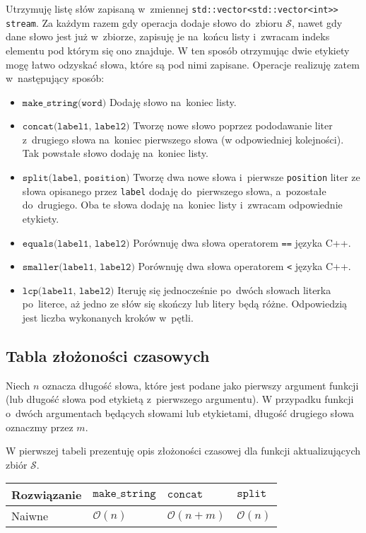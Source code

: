 \documentclass[declaration,shortabstract]{iithesis}
\theoremstyle{definition} \newtheorem{definition}{Definicja}[chapter]
\theoremstyle{plain} \newtheorem{remark}[definition]{Obserwacja}
\theoremstyle{plain} \newtheorem{theorem}[definition]{Twierdzenie}
\theoremstyle{plain} \newtheorem{example}{Przykład}[definition]
\theoremstyle{plain} \newtheorem{lemma}[definition]{Lemat}
\begin{document}
Utrzymuję listę słów zapisaną w~zmiennej \texttt{std::vector<std::vector<int>> stream}. Za każdym razem gdy operacja dodaje słowo do~zbioru $\mathcal{S}$, nawet gdy dane słowo jest już w~zbiorze, zapisuję je na~końcu listy i~zwracam indeks elementu pod którym się ono znajduje. W ten sposób otrzymując dwie etykiety mogę łatwo odzyskać słowa, które są pod nimi zapisane. Operacje realizuję zatem w~następujący sposób:
\begin{itemize}
    \item $\texttt{make\_string(word)}$ Dodaję słowo na~koniec listy.
    \item $\texttt{concat(label1, label2)}$ Tworzę nowe słowo poprzez pododawanie liter z~drugiego słowa na~koniec pierwszego słowa (w odpowiedniej kolejności). Tak powstałe słowo dodaję na~koniec listy. 
    \item $\texttt{split(label, position)}$ Tworzę dwa nowe słowa i~pierwsze \texttt{position} liter ze słowa opisanego przez \texttt{label} dodaję do~pierwszego słowa, a~pozostałe do~drugiego. Oba te słowa dodaję na~koniec listy i~zwracam odpowiednie etykiety.
    \item $\texttt{equals(label1, label2)}$ Porównuję dwa słowa operatorem \texttt{==} języka C++.
    \item $\texttt{smaller(label1, label2)}$ Porównuję dwa słowa operatorem \texttt{<} języka C++.
    \item $\texttt{lcp(label1, label2)}$ Iteruję się jednocześnie po~dwóch słowach literka po~literce, aż jedno ze słów się skończy lub litery będą różne. Odpowiedzią jest liczba wykonanych kroków w~pętli.
\end{itemize}

\subsection{Tabla złożoności czasowych}

Niech $n$ oznacza długość słowa, które jest podane jako pierwszy argument funkcji (lub długość słowa pod etykietą z~pierwszego argumentu). W przypadku funkcji o~dwóch argumentach będących słowami lub etykietami, długość drugiego słowa oznaczmy przez $m$.

W pierwszej tabeli prezentuję opis złożoności czasowej dla funkcji aktualizujących zbiór $\mathcal{S}$.

\begin{center}
    \begin{tabular}{ | m{3cm} | >{\centering\arraybackslash}m{3cm} | >{\centering\arraybackslash}m{3cm} | >{\centering\arraybackslash}m{3cm} | }
        \hline 
        Rozwiązanie & $\texttt{make\_string}$ & $\texttt{concat}$ & $\texttt{split}$ \\
        \hline
        Naiwne & $\mathcal{O}(n)$ & $\mathcal{O}(n + m)$ & $\mathcal{O}(n)$ \\
        \hline
    \end{tabular}
\end{center}
\end{document}
